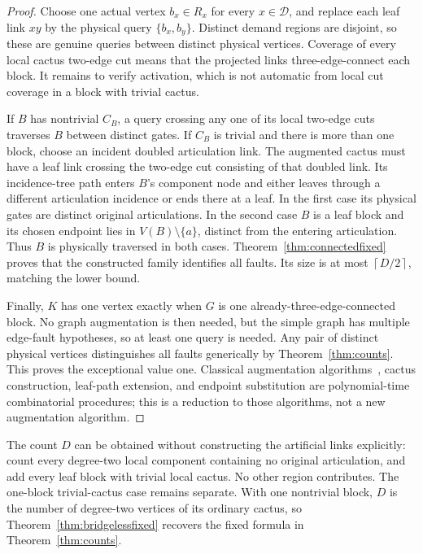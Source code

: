 \documentclass[11pt,letterpaper]{article}
\newcommand{\ceil}[1]{\left\lceil #1\right\rceil}
\begin{document}
\begin{proof}
Choose one actual vertex $b_x\in R_x$ for every $x\in\mathcal D$, and replace each leaf link $xy$ by the physical query $\{b_x,b_y\}$. Distinct demand regions are disjoint, so these are genuine queries between distinct physical vertices. Coverage of every local cactus two-edge cut means that the projected links three-edge-connect each block. It remains to verify activation, which is not automatic from local cut coverage in a block with trivial cactus.

If $B$ has nontrivial $C_B$, a query crossing any one of its local two-edge cuts traverses $B$ between distinct gates. If $C_B$ is trivial and there is more than one block, choose an incident doubled articulation link. The augmented cactus must have a leaf link crossing the two-edge cut consisting of that doubled link. Its incidence-tree path enters $B$'s component node and either leaves through a different articulation incidence or ends there at a leaf. In the first case its physical gates are distinct original articulations. In the second case $B$ is a leaf block and its chosen endpoint lies in $V(B)\setminus\{a\}$, distinct from the entering articulation. Thus $B$ is physically traversed in both cases. Theorem~\ref{thm:connectedfixed} proves that the constructed family identifies all faults. Its size is at most $\ceil{D/2}$, matching the lower bound.

Finally, $K$ has one vertex exactly when $G$ is one already-three-edge-connected block. No graph augmentation is then needed, but the simple graph has multiple edge-fault hypotheses, so at least one query is needed. Any pair of distinct physical vertices distinguishes all faults generically by Theorem~\ref{thm:counts}. This proves the exceptional value one. Classical augmentation algorithms~\cite{WY}, cactus construction, leaf-path extension, and endpoint substitution are polynomial-time combinatorial procedures; this is a reduction to those algorithms, not a new augmentation algorithm.
\end{proof}

The count $D$ can be obtained without constructing the artificial links explicitly: count every degree-two local component containing no original articulation, and add every leaf block with trivial local cactus. No other region contributes. The one-block trivial-cactus case remains separate. With one nontrivial block, $D$ is the number of degree-two vertices of its ordinary cactus, so Theorem~\ref{thm:bridgelessfixed} recovers the fixed formula in Theorem~\ref{thm:counts}.
\end{document}
